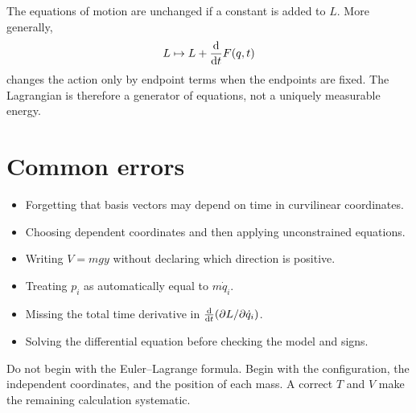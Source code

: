 \documentclass[11pt,a4paper]{article}
\begin{document}
The equations of motion are unchanged if a constant is added to $L$. More generally,
\[
L\mapsto L+\frac{\mathop{}\!\mathrm d }{\mathop{}\!\mathrm d t}F(q,t)
\]
changes the action only by endpoint terms when the endpoints are fixed. The Lagrangian is therefore a generator of equations, not a uniquely measurable energy.

\section{Common errors}

\begin{itemize}
\item Forgetting that basis vectors may depend on time in curvilinear coordinates.
\item Choosing dependent coordinates and then applying unconstrained equations.
\item Writing $V=mgy$ without declaring which direction is positive.
\item Treating $p_i$ as automatically equal to $m\dot q_i$.
\item Missing the total time derivative in $\frac{\mathop{}\!\mathrm d }{\mathop{}\!\mathrm d t}(\partial L/\partial\dot q_i)$.
\item Solving the differential equation before checking the model and signs.
\end{itemize}

\begin{checkBox}
Do not begin with the Euler--Lagrange formula. Begin with the configuration, the independent coordinates, and the position of each mass. A correct $T$ and $V$ make the remaining calculation systematic.
\end{checkBox}
\end{document}
